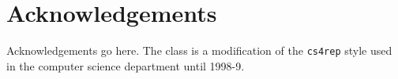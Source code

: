 \section*{Acknowledgements}
Acknowledgements go here. 
The class is a modification of the {\tt cs4rep} style 
used in the computer science department until 1998-9.